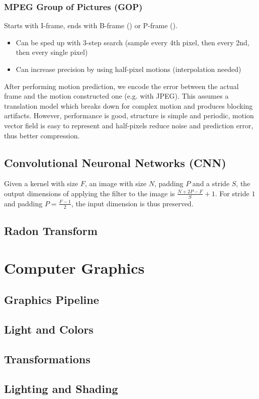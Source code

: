 \documentclass[a4paper,10pt]{article}
\begin{document}
\subsubsection{MPEG Group of Pictures (GOP)} Starts with I-frame, ends with B-frame () or P-frame ().
\begin{itemize}
    \item Can be sped up with 3-step search (sample every 4th pixel, then every 2nd, then every single pixel)
    \item Can increase precision by using half-pixel motions (interpolation needed)
\end{itemize}
After performing motion prediction, we encode the error between the actual frame and the motion constructed one (e.g. with JPEG). This assumes a translation model which breaks down for complex motion and produces blocking artifacts. However, performance is good, structure is simple and periodic, motion vector field is easy to represent and half-pixels reduce noise and prediction error, thus better compression.

\subsection{Convolutional Neuronal Networks (CNN)}
Given a kernel with size \(F\), an image with size \(N\), padding \(P\) and a stride \(S\), the output dimensions of applying the filter to the image is \(\frac{N + 2P - F}{S} + 1\). For stride \(1\) and padding \(P = \frac{F - 1}{2}\), the input dimension is thus preserved.

\subsection{Radon Transform}
\section{Computer Graphics}
\subsection{Graphics Pipeline}
\subsection{Light and Colors}
\subsection{Transformations}
\subsection{Lighting and Shading}
\end{document}
